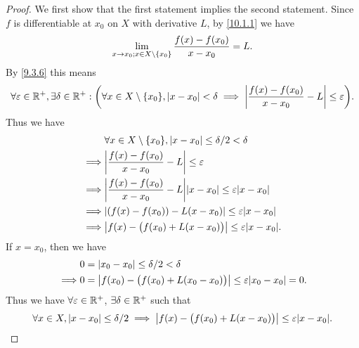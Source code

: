 \begin{proof}
  We first show that the first statement implies the second statement.
  Since \(f\) is differentiable at \(x_0\) on \(X\) with derivative \(L\), by \cref{10.1.1} we have
  \[
    \lim_{x \to x_0 ; x \in X \setminus \left\lbrace x_0\right\rbrace} \dfrac{f(x) - f(x_0)}{x - x_0} = L.
  \]
  By \cref{9.3.6} this means
  \[
    \forall \varepsilon \in \R^+, \exists \delta \in \R^+ : \bigg(\forall x \in X \setminus \set{x_0}, \abs{x - x_0} < \delta \implies \abs{\dfrac{f(x) - f(x_0)}{x - x_0} - L} \leq \varepsilon\bigg).
  \]
  Thus we have
  \begin{align*}
             & \forall x \in X \setminus \set{x_0}, \abs{x - x_0} \leq \delta / 2 < \delta           \\
    \implies & \abs{\dfrac{f(x) - f(x_0)}{x - x_0} - L} \leq \varepsilon                             \\
    \implies & \abs{\dfrac{f(x) - f(x_0)}{x - x_0} - L} \abs{x - x_0} \leq \varepsilon \abs{x - x_0} \\
    \implies & \abs{(f(x) - f(x_0)) - L(x - x_0)} \leq \varepsilon \abs{x - x_0}                     \\
    \implies & \abs{f(x) - \big(f(x_0) + L(x - x_0)\big)} \leq \varepsilon \abs{x - x_0}.
  \end{align*}
  If \(x = x_0\), then we have
  \begin{align*}
             & 0 = \abs{x_0 - x_0} \leq \delta / 2 < \delta                                             \\
    \implies & 0 = \abs{f(x_0) - \big(f(x_0) + L(x_0 - x_0)\big)} \leq \varepsilon \abs{x_0 - x_0} = 0.
  \end{align*}
  Thus we have \(\forall \varepsilon \in \mathbb{R}^+\), \(\exists \delta \in \mathbb{R}^+\) such that
  \[
    \forall x \in X, \abs{x - x_0} \leq \delta / 2 \implies \abs{f(x) - \big(f(x_0) + L(x - x_0)\big)} \leq \varepsilon \abs{x - x_0}.
  \]


\end{proof}
